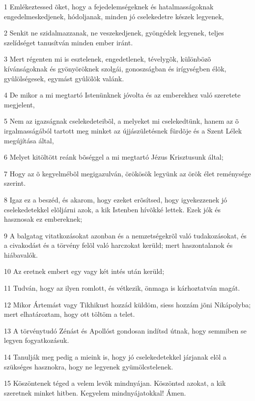 \par 1 Emlékeztessed õket, hogy a fejedelemségeknek és hatalmasságoknak engedelmeskedjenek, hódoljanak, minden jó cselekedetre készek legyenek,
\par 2 Senkit ne szidalmazzanak, ne veszekedjenek, gyöngédek legyenek, teljes szelídséget tanusítván minden ember iránt.
\par 3 Mert régenten mi is esztelenek, engedetlenek, tévelygõk, különbözõ kívánságoknak és gyönyöröknek szolgái, gonoszságban és irígységben élõk, gyûlölségesek, egymást gyûlölõk valánk.
\par 4 De mikor a mi megtartó Istenünknek jóvolta és az emberekhez való szeretete megjelent,
\par 5 Nem az igazságnak cselekedeteibõl, a melyeket mi cselekedtünk, hanem az õ irgalmasságából tartott meg minket az újjászületésnek fürdõje és a Szent Lélek megújítása által,
\par 6 Melyet kitöltött reánk bõséggel a mi megtartó Jézus Krisztusunk által;
\par 7 Hogy az õ kegyelmébõl megigazulván, örökösök legyünk az örök élet reménysége szerint.
\par 8 Igaz ez a beszéd, és akarom, hogy ezeket erõsítsed, hogy igyekezzenek jó cselekedetekkel elõljárni azok, a kik Istenben hívõkké lettek. Ezek jók és hasznosak ez embereknek;
\par 9 A balgatag vitatkozásokat azonban és a nemzetségekrõl való tudakozásokat, és a civakodást és a törvény felõl való harczokat kerüld; mert haszontalanok és hiábavalók.
\par 10 Az eretnek embert egy vagy két intés után kerüld;
\par 11 Tudván, hogy az ilyen romlott, és vétkezik, önmaga is kárhoztatván magát.
\par 12 Mikor Ártemást vagy Tikhikust hozzád küldöm, siess hozzám jõni Nikápolyba; mert elhatároztam, hogy ott töltöm a telet.
\par 13 A törvénytudó Zénást és Apollóst gondosan indítsd útnak, hogy semmiben se legyen fogyatkozásuk.
\par 14 Tanulják meg pedig a mieink is, hogy jó cselekedetekkel járjanak elõl a szükséges hasznokra, hogy ne legyenek gyümölcstelenek.
\par 15 Köszöntenek téged a velem levõk mindnyájan. Köszöntsd azokat, a kik szeretnek minket hitben. Kegyelem mindnyájatokkal! Ámen.


